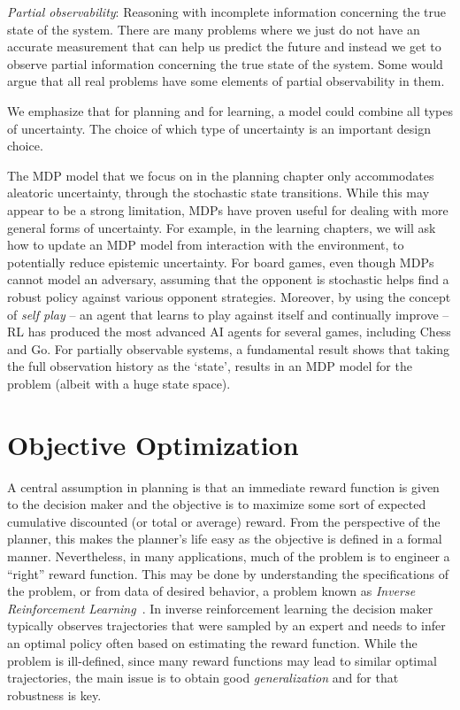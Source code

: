     
    {\em Partial observability}: Reasoning with incomplete information concerning the true state of the system. There are many problems where  we just do not have an accurate measurement that can help us predict the future and instead we get to observe partial information concerning the true state of the system. Some would argue that all real problems have some elements of partial observability in them.


We emphasize that for planning and for learning, a model could combine all types of uncertainty. The choice of which type of uncertainty is an important  design choice.  

The MDP model that we focus on in the planning chapter only accommodates aleatoric uncertainty, through the stochastic state transitions. While this may appear to be a strong limitation, MDPs have proven useful for dealing with more general forms of uncertainty. For example, in the learning chapters, we will ask how to update an MDP model from interaction with the environment, to potentially reduce epistemic uncertainty. For board games, even though MDPs cannot model an adversary, assuming that the opponent is stochastic helps find a robust policy against various opponent strategies. Moreover, by using the concept of \textit{self play} -- an agent that learns to play against itself and continually improve -- RL has produced the most advanced AI agents for several games, including Chess and Go. For partially observable systems, a fundamental result shows that taking the full observation history as the `state', results in an MDP model for the problem (albeit with a huge state space). 




\section{Objective Optimization}

A central assumption in planning is that an immediate reward function is given to the decision maker and the objective is to maximize some sort of expected cumulative discounted (or total or average) reward. 
From the perspective of the planner, this makes the planner's life easy as the objective is defined in a formal manner.
Nevertheless, in many applications, much of the problem is to engineer a ``right'' reward function. This may be done by understanding the specifications of the problem, or from data of desired behavior, a problem known as \textit{Inverse Reinforcement Learning}~\cite{ng2000algorithms}. In inverse reinforcement learning the decision maker typically observes trajectories that were sampled by an expert and needs to infer an optimal policy often based on estimating the reward function. While the problem is ill-defined, since many reward functions may lead to similar optimal trajectories, the main issue is to obtain good {\em generalization} and for that robustness is key.


